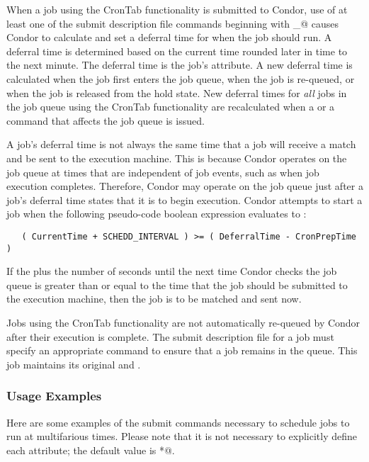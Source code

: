 When a job using the CronTab functionality is submitted to Condor, 
use of at least one of the submit description file commands
beginning with \verb@cron_@ causes Condor
to calculate and set a deferral time for when the job should run. 
A deferral time is determined based on the current time 
rounded later in time to the next minute. 
The deferral time is the job's  attribute. 
A new deferral time is calculated when the job 
first enters the job queue, when 
the job is re-queued, or when the job is released from the hold state. 
New deferral times for \emph{all} jobs in the job queue 
using the CronTab functionality are recalculated 
when a  or a  command that
affects the job queue is issued.

A job's deferral time is not always the same time that a job 
will receive a match and be sent to the execution machine. 
This is because Condor operates on the job queue
at times that are independent of job events,
such as when job execution completes.
Therefore,
Condor may operate on the job queue just after 
a job's deferral time states that it is to begin execution. 
Condor attempts to start a job when the 
following pseudo-code boolean expression evaluates to :

\footnotesize
\begin{verbatim}
   ( CurrentTime + SCHEDD_INTERVAL ) >= ( DeferralTime - CronPrepTime )
\end{verbatim}
\normalsize

If the  plus the number of seconds 
until the next time Condor checks 
the job queue is greater than or equal to the time that the job 
should be submitted to the execution machine, 
then the job is to be matched and sent now.

Jobs using the CronTab functionality are not automatically 
re-queued by Condor after their execution is complete. 
The submit description file for a job
must specify an appropriate  
command to ensure that a job remains in the queue. 
This job maintains its original  and .

\subsubsection{Usage Examples}
\label{sec:crontab-examples}

Here are some examples of the submit commands
necessary to schedule jobs to run at multifarious times. 
Please note that it is not necessary to 
explicitly define each attribute; the default value is \verb@*@.

